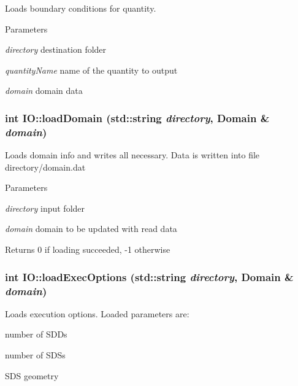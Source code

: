 Loads boundary conditions for quantity. 
\begin{DoxyParams}{Parameters}
\item[{\em directory}]destination folder \item[{\em quantityName}]name of the quantity to output \item[{\em domain}]domain data \end{DoxyParams}
\hypertarget{namespaceIO_a418e0be241e707d7d99718c3a1dacf6b}{
\subsubsection[{loadDomain}]{\setlength{\rightskip}{0pt plus 5cm}int IO::loadDomain (std::string {\em directory}, \/  {\bf Domain} \& {\em domain})}}
\label{namespaceIO_a418e0be241e707d7d99718c3a1dacf6b}


Loads domain info and writes all necessary. Data is written into file directory/domain.dat


\begin{DoxyParams}{Parameters}
\item[{\em directory}]input folder \item[{\em domain}]domain to be updated with read data\end{DoxyParams}
\begin{DoxyReturn}{Returns}
0 if loading succeeded, -\/1 otherwise 
\end{DoxyReturn}
\hypertarget{namespaceIO_ae9baa8f2d704798ba4b669718c5630c6}{
\subsubsection[{loadExecOptions}]{\setlength{\rightskip}{0pt plus 5cm}int IO::loadExecOptions (std::string {\em directory}, \/  {\bf Domain} \& {\em domain})}}
\label{namespaceIO_ae9baa8f2d704798ba4b669718c5630c6}


Loads execution options. Loaded parameters are:
\begin{DoxyItemize}
\item number of SDDs
\item number of SDSs
\item SDS geometry
\end{DoxyItemize}


